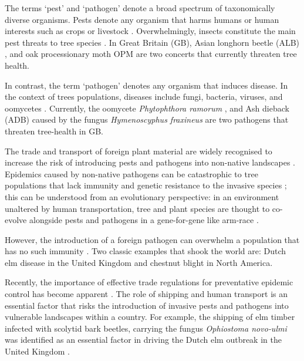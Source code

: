 
The terms `pest' and `pathogen' denote a broad spectrum of taxonomically diverse organisms. 
Pests denote any organism that harms humans or human interests such as crops or livestock
\cite{buckle2015rodent, oerke2006crop, de1964biological}. Overwhelmingly, insects constitute the main
pest threats to tree species \cite{metcalf1994introduction}. In Great Britain (GB), Asian longhorn beetle
(ALB) \cite{haack2010managing}, and oak processionary moth OPM \cite{tomlinson2015managing} are two concerts
that currently threaten tree health.

In contrast, the term `pathogen' denotes any organism that induces disease. 
In the context of trees populations, diseases include fungi, bacteria, viruses, and oomycetes \cite{balloux2017q, Boyd1235773}. 
Currently, the oomycete \textit{Phytophthora ramorum} \cite{brasier2005phytophthora}, and Ash dieback (ADB)
caused by the fungus \textit{Hymenoscyphus fraxineus} \cite{ash-dieback-costs, mitchell2014ash} are two pathogens
that threaten tree-health in GB.

The trade and transport of foreign plant material are widely recognised to increase the risk
of introducing pests and pathogens into non-native landscapes \cite{POTTER201761, lovett2016nonnative, roy2014increasing}.
Epidemics caused by non-native pathogens can be catastrophic to tree populations that lack immunity and genetic
resistance to the invasive species \cite{doi:10.1002/9781444329988.ch8}; this can be understood from an evolutionary perspective: 
in an environment unaltered by human transportation, tree and plant species are thought to co-evolve alongside pests and pathogens
in a gene-for-gene like arm-race \cite{flor1971current, dangl2001plant, Thrall1735}. 

However, the introduction of a foreign
pathogen can overwhelm a population that has no such immunity \cite{desprez2016evolutionary}. Two classic examples that shook
the world are: Dutch elm disease \cite{doi:10.1111/j.1365-3059.2010.02391.x} in the United Kingdom and chestnut blight
\cite{doi:10.1002/9780470535486.ch7} in North America.

Recently, the importance of effective trade regulations for preventative epidemic control has become apparent
\cite{rodoni2009role}. The role of shipping and human transport is an essential factor that risks the introduction
of invasive pests and pathogens into vulnerable landscapes within a country. For example, the shipping of elm timber
infected with scolytid bark beetles, carrying the fungus \textit{Ophiostoma novo‐ulmi} was identified as an essential
factor in driving the Dutch elm outbreak in the United Kingdom \cite{doi:10.1111/j.1365-3059.2010.02391.x}. 

